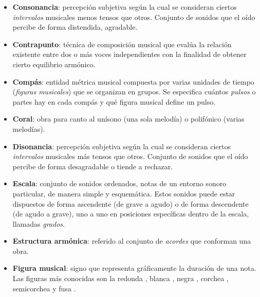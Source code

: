 \begin{itemize}[label={}, leftmargin=*]
	\item \textbf{Consonancia}: percepción subjetiva según la cual se consideran ciertos \textit{intervalos} musicales menos tensos que otros. Conjunto de sonidos que el oído percibe de forma distendida, agradable.

	\bigskip

	\item \textbf{Contrapunto}: técnica de composición musical que evalúa la relación existente entre dos o más voces independientes  con la finalidad de obtener cierto equilibrio armónico.

	\bigskip

	\item \textbf{Compás}: entidad métrica musical compuesta por varias unidades de tiempo (\textit{figuras musicales}) que se organizan en grupos. Se especifica cuántos \textit{pulsos} o partes hay en cada compás y qué figura musical define un pulso.

	\bigskip

	\item \textbf{Coral}: obra para canto al unísono (una sola melodía) o polifónico (varias melodías).

	\bigskip

	\item \textbf{Disonancia}: percepción subjetiva según la cual se consideran ciertos \textit{intervalos} musicales más tensos que otros. Conjunto de sonidos que el oído percibe de forma desagradable o tiende a rechazar.

	\bigskip

	\item \textbf{Escala}: conjunto de sonidos ordenados, notas de un entorno sonoro particular, de manera simple y esquemática. Estos sonidos puede estar dispuestos de forma ascendente (de grave a agudo) o de forma descendente (de agudo a grave), uno a uno en posiciones específicas dentro de la escala, llamadas \textit{grados}.

	\bigskip

	\item \textbf{Estructura armónica}: referido al conjunto de \textit{acordes} que conforman una obra. 

	\bigskip

	\item \textbf{Figura musical}: signo que representa gráficamente la duración de una nota. Las figuras más conocidas son la redonda \wholeNote{}, blanca \halfNote{}, negra \quarterNote{}, corchea \eighthNote{}, semicorchea \sixteenthNote{} y fusa \thirtysecondNote{}.


\end{itemize}
